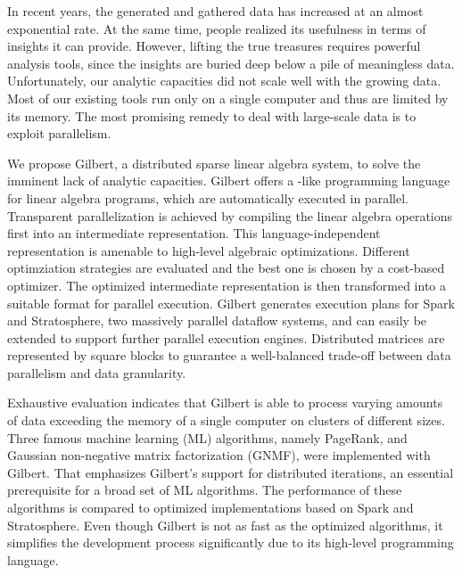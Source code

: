 \clearemptydoublepage
{}
{}

\vspace*{2cm}
\begin{center}
\end{center}
\vspace{1cm}

In recent years, the generated and gathered data has increased at an almost exponential rate.
At the same time, people realized its usefulness in terms of insights it can provide.
However, lifting the true treasures requires powerful analysis tools, since the insights are buried deep below a pile of meaningless data.
Unfortunately, our analytic capacities did not scale well with the growing data.
Most of our existing tools run only on a single computer and thus are limited by its memory.
The most promising remedy to deal with large-scale data is to exploit parallelism.

We propose Gilbert, a distributed sparse linear algebra system, to solve the imminent lack of analytic capacities.
Gilbert offers a \matlab-like programming language for linear algebra programs, which are automatically executed in parallel.
Transparent parallelization is achieved by compiling the linear algebra operations first into an intermediate representation.
This language-independent representation is amenable to high-level algebraic optimizations.
Different optimziation strategies are evaluated and the best one is chosen by a cost-based optimizer.
The optimized intermediate representation is then transformed into a suitable format for parallel execution.
Gilbert generates execution plans for Spark and Stratosphere, two massively parallel dataflow systems, and can easily be extended to support further parallel execution engines.
Distributed matrices are represented by square blocks to guarantee a well-balanced trade-off between data parallelism and data granularity.

Exhaustive evaluation indicates that Gilbert is able to process varying amounts of data exceeding the memory of a single computer on clusters of different sizes.
Three famous machine learning (ML) algorithms, namely PageRank, \kmeans and Gaussian non-negative matrix factorization (GNMF), were implemented with Gilbert.
That emphasizes Gilbert's support for distributed iterations, an essential prerequisite for a broad set of ML algorithms.
The performance of these algorithms is compared to optimized implementations based on Spark and Stratosphere.
Even though Gilbert is not as fast as the optimized algorithms, it simplifies the development process significantly due to its high-level programming language.